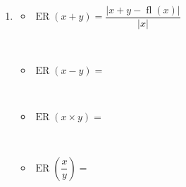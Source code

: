 \begin{frame}
\begin{solution}
\begin{enumerate}
			\item

			      \begin{multicols}{2}
				      \begin{itemize}
					      \item

					            \begin{math}
						            \operatorname{ER}\left(x+y\right)=
						            \dfrac{
							            \left|
							            x+y-
							            \operatorname{fl}\left(x\right)
							            \right|
						            }{
							            \left|
							            x
							            \right|
						            }
					            \end{math}

					            \

					      \item

					            \begin{math}
						            \operatorname{ER}\left(x-y\right)=
					            \end{math}

					            \

					      \item

					            \begin{math}
						            \operatorname{ER}\left(x\times y\right)=
					            \end{math}

					            \

					      \item

					            \begin{math}
						            \operatorname{ER}\left(\dfrac{x}{y}\right)=
					            \end{math}
				      \end{itemize}
			      \end{multicols}
		\end{enumerate}
	\end{solution}

\end{frame}